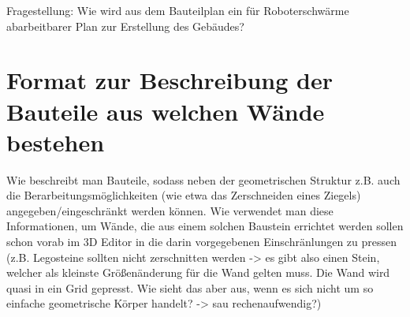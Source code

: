 Fragestellung: Wie wird aus dem Bauteilplan ein für Roboterschwärme abarbeitbarer Plan zur Erstellung des Gebäudes?

\section{Format zur Beschreibung der Bauteile aus welchen Wände bestehen}
Wie beschreibt man Bauteile, sodass neben der geometrischen Struktur z.B. auch die Berarbeitungsmöglichkeiten (wie etwa das Zerschneiden eines Ziegels) angegeben/eingeschränkt werden können.
Wie verwendet man diese Informationen, um Wände, die aus einem solchen Baustein errichtet werden sollen schon vorab im 3D Editor in die darin vorgegebenen Einschränlungen zu pressen (z.B. Legosteine sollten nicht zerschnitten werden -> es gibt also einen Stein, welcher als kleinste Größenänderung für die Wand gelten muss. Die Wand wird quasi in ein Grid gepresst. Wie sieht das aber aus, wenn es sich nicht um so einfache geometrische Körper handelt? -> sau rechenaufwendig?)